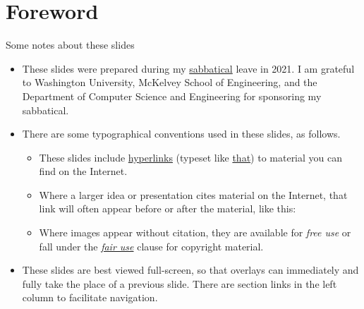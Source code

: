 
\section{Foreword}


\begin{frame}{Some notes about these slides}
\begin{itemize}[<+->]
    \item These slides were prepared during my \href{https://en.wikipedia.org/wiki/Sabbatical}{sabbatical} leave in 2021.  I am grateful to Washington University, McKelvey School of Engineering, and the Department of Computer Science and Engineering for sponsoring my sabbatical.
    \item There are some typographical conventions used in these slides, as follows.
    \begin{itemize}
        \item These slides include \href{https://en.wikipedia.org/wiki/Hyperlink}{hyperlinks} (typeset like \href{https://en.wikipedia.org/wiki/Hyperlin}{that}) to material you can find on the Internet.
        \item Where a larger idea or presentation cites material on the Internet, that link will often appear before or after the material, like this: 
        \item Where images appear without citation, they are available for \emph{free use} or fall under the \href{https://en.wikipedia.org/wiki/Fair_use}{\emph{fair use}} clause for copyright material. 
    \end{itemize}
    \item These slides are best viewed full-screen, so that overlays can immediately and fully take the place of a previous slide.  There are section links in the left column to facilitate navigation.
\end{itemize}
\end{frame}

